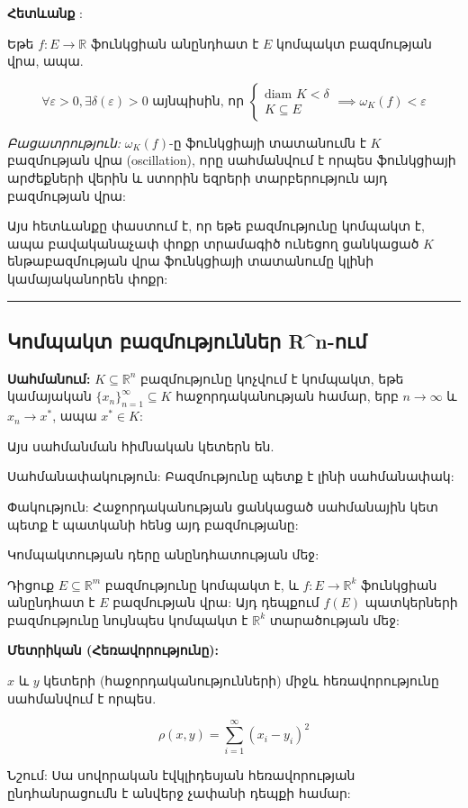 \documentclass[12pt, a4paper]{article}
\begin{document}
\textbf{Հետևանք} :

Եթե $f: E \to \mathbb{R}$ ֆունկցիան անընդհատ է $E$ կոմպակտ բազմության վրա, ապա.

$$\forall \varepsilon > 0, \exists \delta(\varepsilon) > 0 \text{ այնպիսին, որ } \begin{cases} \text{diam } K < \delta \\ K \subseteq E \end{cases} \implies \omega_K(f) < \varepsilon$$

\textit{Բացատրություն:}
$\omega_K(f)$-ը ֆունկցիայի տատանումն է $K$ բազմության վրա (oscillation), որը սահմանվում է որպես ֆունկցիայի արժեքների վերին և ստորին եզրերի տարբերություն այդ բազմության վրա:

Այս հետևանքը փաստում է, որ եթե բազմությունը կոմպակտ է, ապա բավականաչափ փոքր տրամագիծ ունեցող ցանկացած $K$ ենթաբազմության վրա ֆունկցիայի տատանումը կլինի կամայականորեն փոքր:

\vspace{1em}
\hrule
\vspace{1em}

\subsection{Կոմպակտ բազմություններ R\textasciicircum n-ում}

\textbf{Սահմանում:}
$K \subseteq \mathbb{R}^n$ բազմությունը կոչվում է կոմպակտ, եթե կամայական $\{x_n\}_{n=1}^{\infty} \subseteq K$ հաջորդականության համար, երբ $n \to \infty$ և $x_n \to x^*$, ապա $x^* \in K$:

Այս սահմանման հիմնական կետերն են.

Սահմանափակություն: Բազմությունը պետք է լինի սահմանափակ:

Փակություն: Հաջորդականության ցանկացած սահմանային կետ պետք է պատկանի հենց այդ բազմությանը:

Կոմպակտության դերը անընդհատության մեջ:

Դիցուք $E \subseteq \mathbb{R}^m$ բազմությունը կոմպակտ է, և $f: E \to \mathbb{R}^k$ ֆունկցիան անընդհատ է $E$ բազմության վրա: Այդ դեպքում $f(E)$ պատկերների բազմությունը նույնպես կոմպակտ է $\mathbb{R}^k$ տարածության մեջ:

\textbf{Մետրիկան (Հեռավորությունը):}

$x$ և $y$ կետերի (հաջորդականությունների) միջև հեռավորությունը սահմանվում է որպես.

$$\rho(x, y) = \sum_{i=1}^{\infty} (x_i - y_i)^2$$

Նշում: Սա սովորական էվկլիդեսյան հեռավորության ընդհանրացումն է անվերջ չափանի դեպքի համար:
\end{document}
